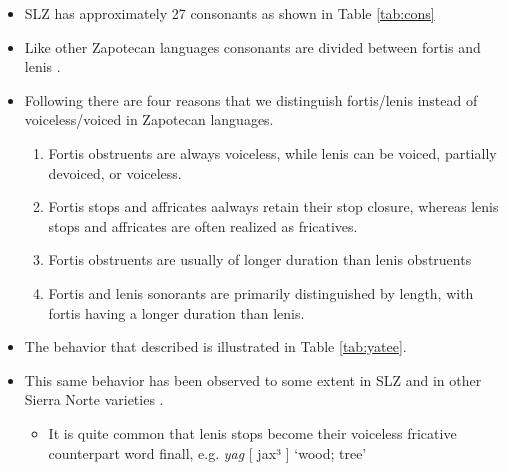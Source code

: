 \documentclass[12pt, letterpaper]{article}
\begin{document}
\begin{itemize}
	\item SLZ has approximately 27 consonants as shown in Table \ref{tab:cons}

	\item Like other Zapotecan languages consonants are divided between fortis and lenis \citep{nellisFortisLenisCajonos1980,jaegerInitialConsonantClusters1982,uchiharaFortisLenisGlides2016}.

	\item Following \citet{jaegerInitialConsonantClusters1982} there are four reasons that we distinguish fortis/lenis instead of voiceless/voiced in Zapotecan languages.
	\begin{enumerate}
		\item Fortis obstruents are always voiceless, while lenis can be voiced, partially devoiced, or voiceless.
		\item Fortis stops and affricates aalways retain their stop closure, whereas lenis stops and affricates are often realized as fricatives.
		\item Fortis obstruents are usually of longer duration than lenis obstruents
		\item Fortis and lenis sonorants are primarily distinguished by length, with fortis having a longer duration than lenis. 
	\end{enumerate}
	\item The behavior that \citet{jaegerInitialConsonantClusters1982} described is illustrated in Table \ref{tab:yatee}. 
	\item This same behavior has been observed to some extent in SLZ and in other Sierra Norte varieties \citep{sonnenscheinDescriptiveGrammarSan2005}.
	\begin{itemize}
		\item It is quite common that lenis stops become their voiceless fricative counterpart word finall, e.g. \textit{yag} [ jax³ ] `wood; tree'
	\end{itemize}
\end{itemize}
\end{document}

